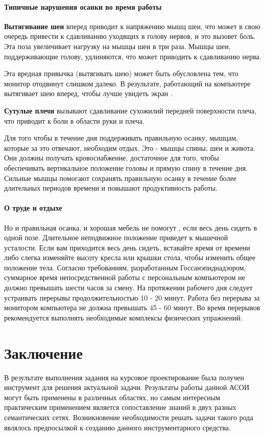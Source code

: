 \documentclass[russian,utf8,emptystyle]{eskdtext}
\begin{document}
\begin{spacing}{1.5}
\paragraph{Типичные нарушения осанки во время работы}
\textbf{Вытягивание шеи} вперед приводит к напряжению мышц шеи, что может в свою очередь привести к сдавливанию уходящих в голову нервов, и это вызовет боль. Эта поза увеличивает нагрузку на мышцы шеи в три раза. Мышцы шеи, поддерживающие голову, удлиняются, что может приводить к сдавливанию нерва.

Эта вредная привычка (вытягивать шею) может быть обусловлена тем, что монитор отодвинут слишком далеко. В результате, работающий на компьютере вытягивает шею вперед, чтобы лучше увидеть экран \cite{Shilova}.

\textbf{Сутулые плечи} вызывают сдавливание сухожилий передней поверхности плеча, что приводит к боли в области руки и плеча.

Для того чтобы в течение дня поддерживать правильную осанку, мышцам, которые за это отвечают, необходим отдых. Это - мышцы спины, шеи и живота. Они должны получать кровоснабжение, достаточное для того, чтобы обеспечивать вертикальное положение головы и прямую спину в течение дня. Сильные мышцы помогают сохранять правильную осанку в течение более длительных периодов времени и повышают продуктивность работы. 

\paragraph{О труде и отдыхе}
Но и правильная осанка, и хорошая мебель не помогут \cite{Shilova}, если весь день сидеть в одной позе. Длительное неподвижное положение приведет к мышечной усталости. Если вам приходится весь день сидеть, вставайте время от времени либо слегка изменяйте высоту кресла или крышки стола, чтобы изменить общее положение тела.
Согласно требованиям, разработанным Госсанэпиднадзором, суммарное время непосредственной работы с персональным компьютером не должно превышать шести часов за смену. На протяжении рабочего дня следует устраивать перерывы продолжительностью 10 - 20 минут. Работа без перерыва за монитором компьютера не должна превышать 45 - 60 минут. Во время перерывов рекомендуется выполнять необходимые комплексы физических упражнений.

\newpage
\section{Заключение}
В результате выполнения задания на курсовое проектирование была получен инструмент для решения актуальной задачи. Результаты работы данной АСОИ могут быть применены в различных областях, но самым интересным практическим применением является сопоставление знаний в двух разных семантических сетях. Возникновение необходимости решать задачи такого рода являлось предпосылкой к созданию данного инструментарного средства.


\end{spacing}
\end{document}
